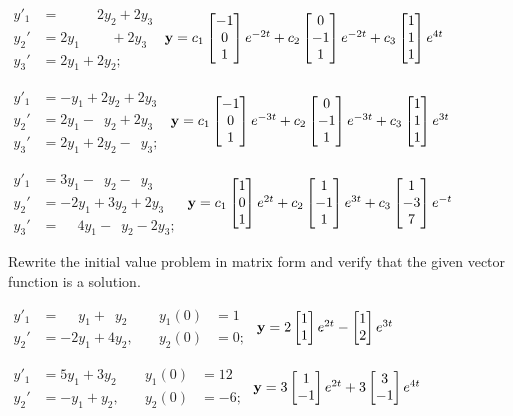 \begin{exerciselist}
\begin{alist}[itemsep=1ex]
\item %
$\begin{aligned}
y'_1&=\phantom{2y_1+}2y_2 + 2y_3 \\
y_2'&=2y_1\phantom{+2y_2} + 2y_3\\
y_3'&=2y_1 + 2y_2;\phantom{+2y_3}\end{aligned}$
\quad
$\mathbf{y}=c_1\begin{bmatrix}-1\\0\\1\end{bmatrix}e^{-2t}+c_2\begin{bmatrix}0\\-1\\1\end{bmatrix}e^{-2t}
+c_3\begin{bmatrix}1\\1\\1\end{bmatrix}e^{4t}$

\item %
$\begin{aligned}
y'_1&=-y_1 +2y_2 + 2y_3\\
y_2'&=2y_1 -\phantom{2}y_2 +2y_3\\
y_3'&=2y_1 + 2y_2
-\phantom{2}y_3;\end{aligned}$
\quad
$\mathbf{y}=c_1\begin{bmatrix}-1\\0\\1\end{bmatrix}e^{-3t}+c_2\begin{bmatrix}0\\-1\\1\end{bmatrix}e^{-3t}
+c_3\begin{bmatrix}1\\1\\1\end{bmatrix}e^{3t}$

\item %
$\begin{aligned}
y'_1&=3y_1 - \phantom{2}y_2-\phantom{2}y_3\\
y_2'&=-2y_1 + 3y_2 + 2y_3\\
y_3'&=\phantom{-}4y_1 -\phantom{3}y_2 - 2y_3;\end{aligned}$
\quad
$\mathbf{y}=c_1\begin{bmatrix}1\\0\\1\end{bmatrix}e^{2t}+c_2\begin{bmatrix}1\\-1\\1\end{bmatrix}e^{3t}
+c_3\begin{bmatrix}1\\-3\\7\end{bmatrix}e^{-t}$
\end{alist}

\item\label{exer:10.2.3}Rewrite the initial value problem in matrix form and
 verify that the given vector function is a solution.

\begin{alist}[itemsep=1ex]
\item %
$\begin{aligned}
y'_1&=\phantom{-2}y_1+\phantom{4}y_2\\
y_2'&=-2y_1 +4y_2,
\end{aligned}\quad
\begin{aligned}
y_1(0)&=1\\
y_2(0)&=0;\end{aligned}$  \quad
$\mathbf{y}=2\begin{bmatrix}1\\1\end{bmatrix}e^{2t}-\begin{bmatrix}1\\2\end{bmatrix}e^{3t}$

\item %
$\begin{aligned}
y'_1&=5y_1 + 3y_2 \\
y_2'&=- y_1 + y_2,
\end{aligned}\quad
\begin{aligned}
y_1(0)&=12\\
y_2(0)&=-6;
\end{aligned}$  \quad
$\mathbf{y}=3\begin{bmatrix}1\\-1\end{bmatrix}e^{2t}+3\begin{bmatrix}3\\-1\end{bmatrix}e^{4t}$
\end{alist}


\end{exerciselist}
